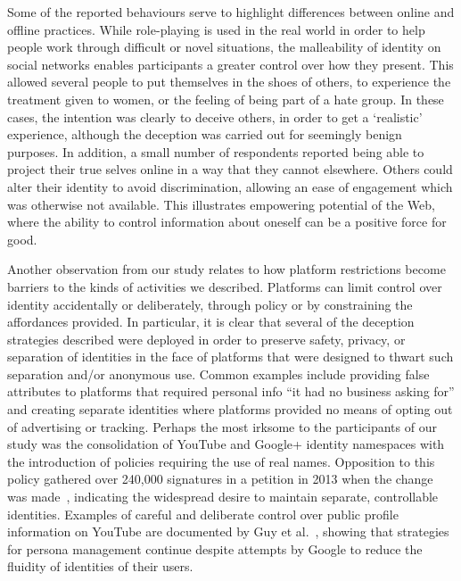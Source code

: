 \documentclass{sig-alternate}
\begin{document}
Some of the reported behaviours serve to highlight differences between online and offline practices. While role-playing is used in the real world in order to help people work through difficult or novel situations, the malleability of identity on social networks enables participants a greater control over how they present. This allowed several people to put themselves in the shoes of others, to experience the treatment given to women, or the feeling of being part of a hate group. In these cases, the intention  was clearly to deceive others, in order to get a `realistic' experience, although the deception was carried out for seemingly benign purposes. In addition, a small number of respondents reported being able to project their true selves online in a way that they cannot elsewhere. Others could alter their identity to avoid discrimination, allowing an ease of engagement which was otherwise not available. This illustrates empowering potential of the Web, where the ability to control information about oneself can be a positive force for good.




Another observation from our study relates to how platform restrictions become barriers to the kinds of activities we described. Platforms can limit control over identity accidentally or deliberately, through policy or by constraining the affordances provided. 
In particular, it is clear that several of the deception strategies described were deployed in order to preserve safety, privacy, or separation of identities in the face of platforms that were designed to thwart such separation and/or anonymous use. 
Common examples include providing false attributes to platforms that required personal info ``it had no business asking for'' and creating separate identities where platforms provided no means of opting out of advertising or tracking. 
Perhaps the most irksome to the participants of our study was the 
consolidation of YouTube and Google+ identity namespaces with the introduction of policies requiring the use of real names. 
Opposition to this policy gathered over 240,000 signatures in a petition in 2013 when the change was made~\cite{noplus}, indicating the widespread desire to maintain separate, controllable identities.  
Examples of careful and deliberate control over public profile information on YouTube are documented by Guy et al.~\cite{guy2014}, showing that strategies for persona management continue despite attempts by Google to reduce the fluidity of identities of their users.
\end{document}
